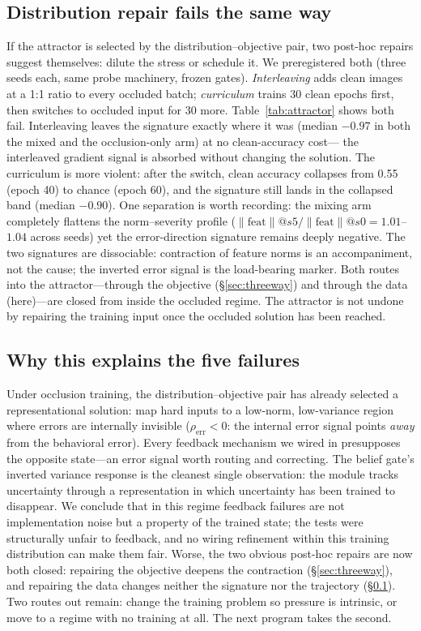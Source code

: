 \documentclass[10pt]{article}
\newcommand{\rhoerr}{\rho_{\mathrm{err}}}
\begin{document}
\subsection{Distribution repair fails the same way}
\label{sec:distrepair}

If the attractor is selected by the distribution--objective pair, two
post-hoc repairs suggest themselves: dilute the stress or schedule it. We
preregistered both (three seeds each, same probe machinery, frozen gates).
\emph{Interleaving} adds clean images at a 1:1 ratio to every occluded
batch; \emph{curriculum} trains 30 clean epochs first, then switches to
occluded input for 30 more. Table~\ref{tab:attractor} shows both fail.
Interleaving leaves the signature exactly where it was (median $-0.97$ in
both the mixed and the occlusion-only arm) at no clean-accuracy cost---%
the interleaved gradient signal is absorbed without changing the solution.
The curriculum is more violent: after the switch, clean accuracy collapses
from 0.55 (epoch 40) to chance (epoch 60), and the signature still lands
in the collapsed band (median $-0.90$). One separation is worth recording: the
mixing arm completely flattens the norm--severity profile
($\|\mathrm{feat}\|@s5/\|\mathrm{feat}\|@s0 = 1.01$--$1.04$ across seeds)
yet the error-direction signature remains deeply negative. The two
signatures are dissociable: contraction of feature norms is an
accompaniment, not the cause; the inverted error signal is the load-bearing
marker. Both routes into the attractor---through the objective
(\S\ref{sec:threeway}) and through the data (here)---are closed from
inside the occluded regime. The attractor is not undone by repairing the
training input once the occluded solution has been reached.

\subsection{Why this explains the five failures}
\label{sec:why}

Under occlusion training, the distribution--objective pair has already
selected a representational solution: map hard inputs to a low-norm,
low-variance region where errors are internally invisible
($\rhoerr < 0$: the internal error signal points \emph{away} from the
behavioral error). Every feedback mechanism we wired in presupposes the
opposite state---an error signal worth routing and correcting. The belief
gate's inverted variance response is the cleanest single observation: the
module tracks uncertainty through a representation in which uncertainty
has been trained to disappear. We conclude that in this regime feedback
failures are not implementation noise but a property of the trained state;
the tests were structurally unfair to feedback, and no wiring refinement
within this training distribution can make them fair. Worse, the two
obvious post-hoc repairs are now both closed: repairing the objective
deepens the contraction (\S\ref{sec:threeway}), and repairing the data
changes neither the signature nor the trajectory
(\S\ref{sec:distrepair}). Two routes out remain: change the training
problem so pressure is intrinsic, or move to a
regime with no training at all. The next program takes the second.
\end{document}

